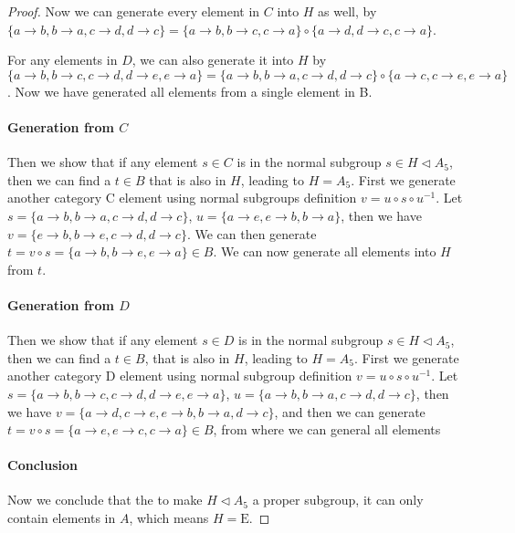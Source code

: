 \documentclass[]{article}
\theoremstyle{definition}\newtheorem{theorem}{Theorem}
\begin{document}
\begin{proof}
Now we can generate every element in $C$ into $H$ as well, by $\{a\rightarrow b, b\rightarrow a, c\rightarrow d, d\rightarrow c\} = \{a\rightarrow b, b \rightarrow c, c\rightarrow a\}\circ \{a\rightarrow d, d\rightarrow c, c\rightarrow a\}$.

For any elements in $D$, we can also generate it into $H$ by $\{a\rightarrow b,b\rightarrow c,c\rightarrow d,d\rightarrow e,e\rightarrow a\} = \{a\rightarrow b, b\rightarrow a, c\rightarrow d, d\rightarrow c\} \circ \{a\rightarrow c, c\rightarrow e, e\rightarrow a\}$. Now we have generated all elements from a single element in B.


\paragraph{Generation from $C$}Then we show that if any element $s\in C$ is in the normal subgroup $s\in H \triangleleft A_5$, then we can find a $t\in B$ that is also in $H$, leading to $H = A_5$. First we generate another category C element using normal subgroups definition $v = u\circ s\circ u^{-1}$. Let $s =  \{a\rightarrow b, b\rightarrow a, c\rightarrow d, d\rightarrow c\}$, $u = \{a\rightarrow e, e\rightarrow b, b\rightarrow a\}$, then we have $v = \{e\rightarrow b, b\rightarrow e,  c\rightarrow d, d\rightarrow c\}$. We can then generate  $t = v\circ s = \{a\rightarrow b, b\rightarrow e, e\rightarrow a\} \in B$. We can now generate all elements into $H$ from $t$.

\paragraph{Generation from $D$}Then we show that if any element $s\in D$ is in the normal subgroup $s\in H \triangleleft A_5$, then we can find a $t \in B$, that is also in $H$, leading to $H = A_5$. First we generate another category D element using normal subgroup definition $v = u\circ s\circ u^{-1}$. Let $s = \{a\rightarrow b, b\rightarrow c, c\rightarrow d, d\rightarrow e, e\rightarrow a\}$, $u = \{a\rightarrow b, b\rightarrow a, c\rightarrow d, d\rightarrow c\}$, then we have $v = \{a\rightarrow d, c\rightarrow e, e\rightarrow b, b\rightarrow a, d\rightarrow c\}$, and then we can generate $t = v\circ s = \{a\rightarrow e,e\rightarrow c,c\rightarrow a\} \in B$, from where we can general all elements

\paragraph{Conclusion}Now we conclude that the to make $H \triangleleft A_5$ a proper subgroup, it can only contain elements in $A$, which means $H = \mathrm{E}$.

\end{proof}
\end{document}

